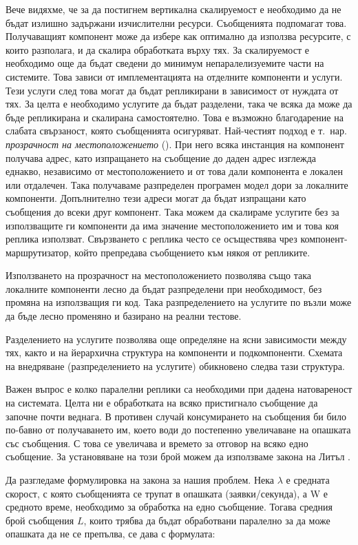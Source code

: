 Вече видяхме, че за да постигнем вертикална скалируемост е необходимо да не бъдат излишно задържани изчислителни ресурси. Съобщенията подпомагат това. Получаващият компонент може да избере как оптимално да използва ресурсите, с които разполага, и да скалира обработката върху тях. За скалируемост е необходимо още да бъдат сведени до минимум непаралелизуемите части на системите. Това зависи от имплементацията на отделните компоненти и услуги. Тези услуги след това могат да бъдат репликирани в зависимост от нуждата от тях. За целта е необходимо услугите да бъдат разделени, така че всяка да може да бъде репликирана и скалирана самостоятелно. Това е възможно благодарение на слабата свързаност, която съобщенията осигуряват. Най-честият подход е т.~нар. \emph{прозрачност на местоположението} (). При него всяка инстанция на компонент получава адрес, като изпращането на съобщение до даден адрес изглежда еднакво, независимо от местоположението и от това дали компонента е локален или отдалечен. Така получаваме разпределен програмен модел дори за локалните компоненти. Допълнително тези адреси могат да бъдат изпращани като съобщения до всеки друг компонент. Така можем да скалираме услугите без за използващите ги компоненти да има значение местоположението им и това коя реплика използват. Свързването с реплика често се осъществява чрез компонент-маршрутизатор, който препредава съобщението към някоя от репликите.

Използването на прозрачност на местоположението позволява също така локалните компоненти лесно да бъдат разпределени при необходимост, без промяна на използващия ги код. Така разпределението на услугите по възли може да бъде лесно променяно и базирано на реални тестове.

Разделението на услугите позволява още определяне на ясни зависимости между тях, както и на йерархична структура на компоненти и подкомпоненти. Схемата на внедряване (разпределението на услугите) обикновено следва тази структура.

Важен въпрос е колко паралелни реплики са необходими при дадена натовареност на системата. Целта ни е обработката на всяко пристигнало съобщение да започне почти веднага. В противен случай консумирането на съобщения би било по-бавно от получаването им, което води до постепенно увеличаване на опашката със съобщения. С това се увеличава и времето за отговор на всяко едно съобщение. За установяване на този брой можем да използваме закона на Литъл \cite{little1961LawProof}.

Да разгледаме формулировка на закона за нашия проблем. Нека $\lambda$ е средната скорост, с която съобщенията се трупат в опашката (заявки/секунда), а W е средното време, необходимо за обработка на едно съобщение. Тогава средния брой съобщения $L$, които трябва да бъдат обработвани паралелно за да може опашката да не се препълва, се дава с формулата:


